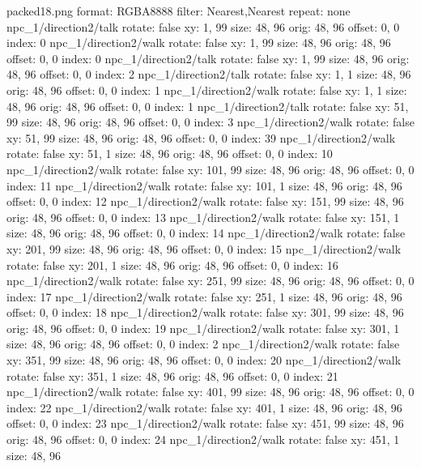 packed18.png
format: RGBA8888
filter: Nearest,Nearest
repeat: none
npc_1/direction2/talk
  rotate: false
  xy: 1, 99
  size: 48, 96
  orig: 48, 96
  offset: 0, 0
  index: 0
npc_1/direction2/walk
  rotate: false
  xy: 1, 99
  size: 48, 96
  orig: 48, 96
  offset: 0, 0
  index: 0
npc_1/direction2/talk
  rotate: false
  xy: 1, 99
  size: 48, 96
  orig: 48, 96
  offset: 0, 0
  index: 2
npc_1/direction2/talk
  rotate: false
  xy: 1, 1
  size: 48, 96
  orig: 48, 96
  offset: 0, 0
  index: 1
npc_1/direction2/walk
  rotate: false
  xy: 1, 1
  size: 48, 96
  orig: 48, 96
  offset: 0, 0
  index: 1
npc_1/direction2/talk
  rotate: false
  xy: 51, 99
  size: 48, 96
  orig: 48, 96
  offset: 0, 0
  index: 3
npc_1/direction2/walk
  rotate: false
  xy: 51, 99
  size: 48, 96
  orig: 48, 96
  offset: 0, 0
  index: 39
npc_1/direction2/walk
  rotate: false
  xy: 51, 1
  size: 48, 96
  orig: 48, 96
  offset: 0, 0
  index: 10
npc_1/direction2/walk
  rotate: false
  xy: 101, 99
  size: 48, 96
  orig: 48, 96
  offset: 0, 0
  index: 11
npc_1/direction2/walk
  rotate: false
  xy: 101, 1
  size: 48, 96
  orig: 48, 96
  offset: 0, 0
  index: 12
npc_1/direction2/walk
  rotate: false
  xy: 151, 99
  size: 48, 96
  orig: 48, 96
  offset: 0, 0
  index: 13
npc_1/direction2/walk
  rotate: false
  xy: 151, 1
  size: 48, 96
  orig: 48, 96
  offset: 0, 0
  index: 14
npc_1/direction2/walk
  rotate: false
  xy: 201, 99
  size: 48, 96
  orig: 48, 96
  offset: 0, 0
  index: 15
npc_1/direction2/walk
  rotate: false
  xy: 201, 1
  size: 48, 96
  orig: 48, 96
  offset: 0, 0
  index: 16
npc_1/direction2/walk
  rotate: false
  xy: 251, 99
  size: 48, 96
  orig: 48, 96
  offset: 0, 0
  index: 17
npc_1/direction2/walk
  rotate: false
  xy: 251, 1
  size: 48, 96
  orig: 48, 96
  offset: 0, 0
  index: 18
npc_1/direction2/walk
  rotate: false
  xy: 301, 99
  size: 48, 96
  orig: 48, 96
  offset: 0, 0
  index: 19
npc_1/direction2/walk
  rotate: false
  xy: 301, 1
  size: 48, 96
  orig: 48, 96
  offset: 0, 0
  index: 2
npc_1/direction2/walk
  rotate: false
  xy: 351, 99
  size: 48, 96
  orig: 48, 96
  offset: 0, 0
  index: 20
npc_1/direction2/walk
  rotate: false
  xy: 351, 1
  size: 48, 96
  orig: 48, 96
  offset: 0, 0
  index: 21
npc_1/direction2/walk
  rotate: false
  xy: 401, 99
  size: 48, 96
  orig: 48, 96
  offset: 0, 0
  index: 22
npc_1/direction2/walk
  rotate: false
  xy: 401, 1
  size: 48, 96
  orig: 48, 96
  offset: 0, 0
  index: 23
npc_1/direction2/walk
  rotate: false
  xy: 451, 99
  size: 48, 96
  orig: 48, 96
  offset: 0, 0
  index: 24
npc_1/direction2/walk
  rotate: false
  xy: 451, 1
  size: 48, 96
